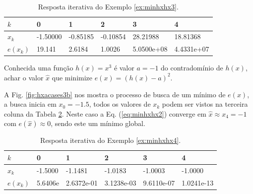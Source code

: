 \begin{table}[!h]
\centering
\begin{tabular}{|l|l|l|l|l|l|}
\hline
$k$      & 0 & 1 & 2 & 3 & 4 \\ \hline
$x_k$    & -1.50000 & -0.85185 & -0.10854 & 28.21988 & 18.81368 \\ \hline
$e(x_k)$ & 19.141 & 2.6184 & 1.0026 & 5.0500e+08 & 4.4331e+07 \\ \hline
\end{tabular}
\caption{Resposta iterativa do Exemplo \ref{ex:minhxhx3}.}
\label{tab:hxacases3}
\end{table}


\begin{example}\label{ex:minhxhx4}
Conhecida uma função $h(x)=x^3$ é valor $a=-1$ do contradomínio de $h(x)$,
achar o valor $\hat{x}$ que minimize $e(x)=(h(x)-a)^2$.
\end{example}
\begin{SolutionT}\label{sol:minhxhx4}
A Fig. \ref{fig:hxacases3b} nos mostra o processo de busca de um mínimo
 de $e(x)$, a busca inicia em $x_0=-1.5$,
 todos os valores de $x_{k}$ podem ser vistos na terceira coluna da
Tabela \ref{tab:hxacases4}. Neste caso a Eq. (\ref{eq:minhxhx2}) converge
em $\hat{x}\approx x_4 =-1$ com $e(\hat{x})\approx 0$, sendo este um mínimo global.
\end{SolutionT}

\begin{table}[!h]
\centering
\begin{tabular}{|l|l|l|l|l|l|}
\hline
$k$      & 0 & 1 & 2 & 3 & 4 \\ \hline
$x_k$    & -1.5000 & -1.1481 & -1.0183 & -1.0003 & -1.0000 \\ \hline
$e(x_k)$ & 5.6406e & 2.6372e-01 & 3.1238e-03 & 9.6110e-07 & 1.0241e-13 \\ \hline
\end{tabular}
\caption{Resposta iterativa do Exemplo \ref{ex:minhxhx4}.}
\label{tab:hxacases4}
\end{table}

